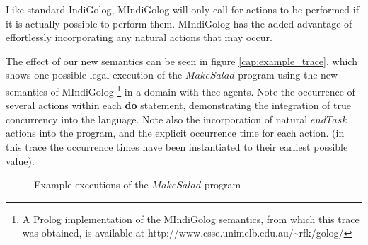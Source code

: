 \documentclass[times, 10pt, twocolumn]{article}
\begin{document}
Like standard IndiGolog, MIndiGolog will only call for actions to
be performed if it is actually possible to perform them. MIndiGolog
has the added advantage of effortlessly incorporating any natural
actions that may occur.



The effect of our new semantics can be seen in figure \ref{cap:example_trace},
which shows one possible legal execution of the $MakeSalad$ program
using the new semantics of MIndiGolog%
\footnote{A Prolog implementation of the MIndiGolog semantics, from which this
trace was obtained, is available at http://www.csse.unimelb.edu.au/\textasciitilde{}rfk/golog/%
} in a domain with thee agents. Note the occurrence of several actions
within each \textbf{do} statement, demonstrating the integration of
true concurrency into the language. Note also the incorporation of
natural $endTask$ actions into the program, and the explicit occurrence
time for each action. (in this trace the occurrence times have been
instantiated to their earliest possible value).

%
\begin{figure*}[t]
\centering {}  


\caption{Example executions of the $MakeSalad$ program}
\end{figure*}
\end{document}
